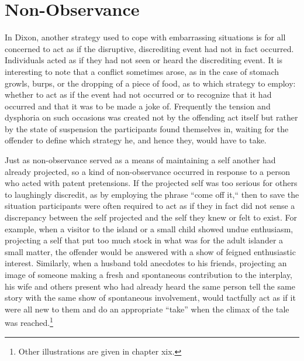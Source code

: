 \documentclass[openany,nobib]{tufte-book}
\begin{document}
\hypertarget{non-observance}{%
\section{Non-Observance}\label{non-observance}}

In Dixon, another strategy used to cope with embarrassing situations is
for all concerned to act as if the disruptive, discrediting event had
not in fact occurred. Individuals acted as if they had not seen or heard
the discrediting event. It is interesting to note that a conflict
sometimes arose, as in the case of stomach growls, burps, or the
dropping of a piece of food, as to which strategy to employ: whether to
act as if the event had not occurred or to recognize that it had
occurred and that it was to be made a joke of. Frequently the tension
and dysphoria on such occasions was created not by the offending act
itself but rather by the state of suspension the participants found
themselves in, waiting for the offender to define which strategy he, and
hence they, would have to take.

Just as non-observance served as a means of maintaining a self another
had already projected, so a kind of non-observance occurred in response
to a person who acted with patent pretensions. If the projected self was
too serious for others to laughingly discredit, as by employing the
phrase ``come off it,`` then to save the situation participants were
often required to act as if they in fact did not sense a discrepancy
between the self projected and the self they knew or felt to exist. For
example, when a visitor to the island or a small child showed undue
enthusiasm, projecting a self that put too much stock in what was for
the adult islander a small matter, the offender would be answered with a
show of feigned enthusiastic interest. Similarly, when a husband told
anecdotes to his friends, projecting an image of someone making a fresh
and spontaneous contribution to the interplay, his wife and others
present who had already heard the same person tell the same story with
the same show of spontaneous involvement, would tactfully act as if it
were all new to them and do an appropriate ``take'' when the climax of
the tale was reached.\footnote{Other illustrations are given in chapter
  xix.}
\end{document}
